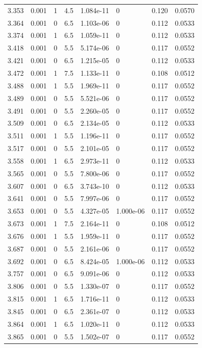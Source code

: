 \documentclass[preview]{standalone}
\begin{document}
{{{{\begin{tabular}{L{1.2cm}C{1.2cm} C{0.3cm}C{0.5cm} C{1.4cm}C{1.4cm} C{1.4cm}C{1.4cm}}
  3.353  &  0.001  & 1     & 4.5 &  1.084e-11  & 0  & 0.120 &  0.0570   \\ 
  3.364  &  0.001  & 0     & 6.5 &  1.103e-06  & 0  & 0.112 &  0.0533   \\ 
  3.374  &  0.001  & 1     & 6.5 &  1.059e-11  & 0  & 0.112 &  0.0533   \\ 
  3.418  &  0.001  & 0     & 5.5 &  5.174e-06  & 0  & 0.117 &  0.0552   \\ 
  3.421  &  0.001  & 0     & 6.5 &  1.215e-05  & 0  & 0.112 &  0.0533   \\ 
  3.472  &  0.001  & 1     & 7.5 &  1.133e-11  & 0  & 0.108 &  0.0512   \\ 
  3.488  &  0.001  & 1     & 5.5 &  1.969e-11  & 0  & 0.117 &  0.0552   \\ 
  3.489  &  0.001  & 0     & 5.5 &  5.521e-06  & 0  & 0.117 &  0.0552   \\ 
  3.491  &  0.001  & 0     & 5.5 &  2.260e-05  & 0  & 0.117 &  0.0552   \\ 
  3.509  &  0.001  & 0     & 6.5 &  2.134e-05  & 0  & 0.112 &  0.0533   \\ 
  3.511  &  0.001  & 1     & 5.5 &  1.196e-11  & 0  & 0.117 &  0.0552   \\ 
  3.517  &  0.001  & 0     & 5.5 &  2.101e-05  & 0  & 0.117 &  0.0552   \\ 
  3.558  &  0.001  & 1     & 6.5 &  2.973e-11  & 0  & 0.112 &  0.0533   \\ 
  3.565  &  0.001  & 0     & 5.5 &  7.800e-06  & 0  & 0.117 &  0.0552   \\ 
  3.607  &  0.001  & 0     & 6.5 &  3.743e-10  & 0  & 0.112 &  0.0533   \\ 
  3.641  &  0.001  & 0     & 5.5 &  7.997e-06  & 0  & 0.117 &  0.0552   \\ 
  3.653  &  0.001  & 0     & 5.5 &  4.327e-05  & 1.000e-06  & 0.117 &  0.0552   \\ 
  3.673  &  0.001  & 1     & 7.5 &  2.164e-11  & 0  & 0.108 &  0.0512   \\ 
  3.676  &  0.001  & 1     & 5.5 &  1.959e-11  & 0  & 0.117 &  0.0552   \\ 
  3.687  &  0.001  & 0     & 5.5 &  2.161e-06  & 0  & 0.117 &  0.0552   \\ 
  3.692  &  0.001  & 0     & 6.5 &  8.424e-05  & 1.000e-06  & 0.112 &  0.0533   \\ 
  3.757  &  0.001  & 0     & 6.5 &  9.091e-06  & 0  & 0.112 &  0.0533   \\ 
  3.806  &  0.001  & 0     & 5.5 &  1.330e-07  & 0  & 0.117 &  0.0552   \\ 
  3.815  &  0.001  & 1     & 6.5 &  1.716e-11  & 0  & 0.112 &  0.0533   \\ 
  3.845  &  0.001  & 0     & 6.5 &  2.361e-07  & 0  & 0.112 &  0.0533   \\ 
  3.864  &  0.001  & 1     & 6.5 &  1.020e-11  & 0  & 0.112 &  0.0533   \\ 
  3.865  &  0.001  & 0     & 5.5 &  1.502e-07  & 0  & 0.117 &  0.0552   \\ 
\hline 
\end{tabular} 

}}}}
\end{document}
